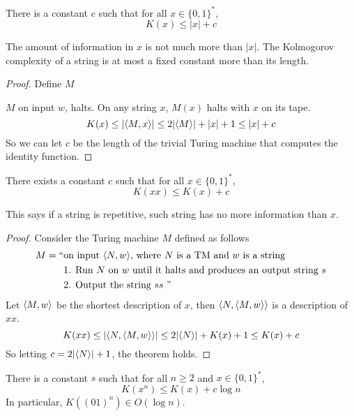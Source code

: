 \begin{theorem}
    There is a constant $c$ such that for all $x \in \{0,1\}^*$,
    $$
    K(x) \leq |x| + c
    $$
\end{theorem}
The amount of information in $x$ is not much more than $|x|$. The Kolmogorov complexity of a string is at most a fixed constant more than its length.

\begin{proof}
    Define $M$
    
    $M$ on input $w$, halts. On any string $x$, $M(x)$ halts with $x$ on its tape.
    $$
    K(x) \leq |\langle M,x \rangle| \leq 2|\langle M \rangle| + |x| + 1 \leq |x| + c
    $$ 
    So we can let $c$ be the length of the trivial Turing machine that computes the identity function.
\end{proof}

\begin{theorem}
    There exists a constant $c$ such that for all $x \in \{0,1\}^*$,
    $$
    K(xx) \leq K(x) + c
    $$
\end{theorem}

This says if a string is repetitive, such string has no more information than $x$.

\begin{proof}
    Consider the Turing machine $M$ defined as follows
    $$
    \begin{aligned}
        M = ``&\text{on input $\langle N,w \rangle$, where $N$ is a TM and $w$ is a string} \\
        &\text{1. Run $N$ on $w$ until it halts and produces an output string $s$} \\
        &\text{2. Output the string $ss$ }"
    \end{aligned}
    $$
    Let $\langle M,w \rangle$ be the shortest description of $x$, then $\langle N,\langle M,w \rangle \rangle$ is a description of $xx$.
    $$
    K(xx) \leq |\langle N,\langle M,w \rangle \rangle| \leq 2|\langle N \rangle| + K(x) + 1 \leq K(x) + c
    $$
    So letting $c = 2|\langle N \rangle| + 1$, the theorem holds.
\end{proof}

\begin{corollary}
    There is a constant $s$ such that for all $n\geq 2$ and $x \in \{0,1\}^*$,
    $$
    K(x^n) \leq K(x) + c \log n
    $$
    In particular, $K((01)^n) \in O(\log n)$.
\end{corollary}

